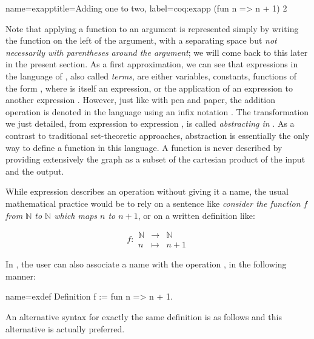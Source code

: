 \begin{coq}{name=exapp}{title=Adding one to two, label=coq:exapp}
  (fun n => n + 1) 2
\end{coq}
Note that applying a function to an argument is represented
simply by writing the function on the left of the argument,
with a separating space but {\em not
  necessarily with parentheses around the argument}; we will come back to this
later in the present section. As a first approximation, we can see
that expressions in the language of \Coq{}, also called \emph{terms},
are either variables, constants,
functions of the form , where  is itself an
expression, or the application  of an expression  to
another expression . However, just like with pen and paper, the addition
operation is denoted in the \Coq{} language using an infix notation \C{+}.
The transformation we just detailed, from expression  to expression
, is called \emph{abstracting  in  }.  As a contrast to traditional set-theoretic approaches,
abstraction is essentially the only way to define a function in this
language.  A function is never described by providing extensively the
graph as a subset of the cartesian product of the input and the output.

While expression  describes an operation
without giving it a name, the usual mathematical practice would be to
rely on a sentence like {\em consider the function \(f\) from {\(\mathbb{N}\)}
to {\(\mathbb{N}\)} which maps \(n\) to \(n + 1\)}, or on a written
definition like:

\begin{equation}\label{equation:f}
f :
\begin{array}{ccc}
{\mathbb{N}} &\rightarrow& {\mathbb{N}}\\
n &\mapsto& n + 1
\end{array}
\end{equation}

In \Coq{}, the user can also associate a name with the operation
, in the following manner:

\begin{coq}{name=exdef}{}
Definition f := fun n => n + 1.
\end{coq}
An alternative syntax for exactly the same definition is as follows
and this alternative is actually preferred.

